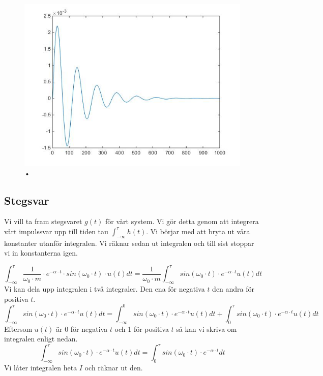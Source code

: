 \documentclass[10pt,a4paper]{article}
\begin{document}
\begin{figure}[h]
\begin{center}

\includegraphics[scale=0.5]{Impulssvar}
\caption{•}
\end{center}
\end{figure}



\newpage

\subsection{Stegsvar}

Vi vill ta fram stegsvaret $g(t)$ för vårt system. Vi gör detta genom att integrera vårt impulssvar upp till tiden tau $\int_{-\infty}^\tau h(t)$. Vi börjar med att bryta ut våra konstanter utanför integralen. Vi räknar sedan ut integralen och till sist stoppar vi in konstanterna igen.

\begin{equation}
\int_{-\infty}^\tau \frac{1} {\omega_0 \cdot m} \cdot e^{-\alpha \cdot t} \cdot sin(\omega_0 \cdot t) \cdot u(t) dt = \frac{1}{\omega_0 \cdot m} \int_{-\infty}^\tau sin(\omega_0 \cdot t)\cdot e^{-\alpha \cdot t} u(t) dt
\end{equation}
Vi kan dela upp integralen i två integraler. Den ena för negativa $t$ den andra för positiva $t$.
$$ \int_{-\infty}^\tau sin(\omega_0 \cdot t)\cdot e^{-\alpha \cdot t} u(t) dt
= \int_{-\infty}^0 sin(\omega_0 \cdot t)\cdot e^{-\alpha \cdot t} u(t) dt + \int_0^\tau sin(\omega_0 \cdot t)\cdot e^{-\alpha \cdot t} u(t) dt $$
Eftersom $u(t)$ är 0 för negativa $t$ och 1 för positiva $t$ så kan vi skriva om integralen enligt nedan.
\begin{equation}
\int_{-\infty}^\tau sin(\omega_0 \cdot t)\cdot e^{-\alpha \cdot t} u(t) dt
= \int_0^\tau sin(\omega_0 \cdot t)\cdot e^{-\alpha \cdot t} dt
\end{equation}
Vi låter integralen heta $I$ och räknar ut den.
\end{document}

